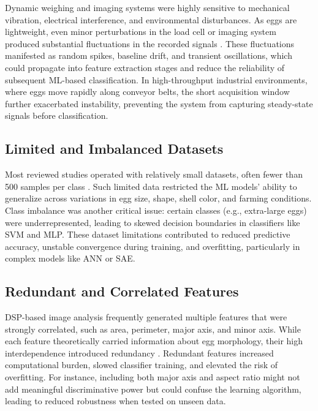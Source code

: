\documentclass[conference]{IEEEtran}
\begin{document}
	Dynamic weighing and imaging systems were highly sensitive to mechanical vibration, electrical interference, and environmental disturbances. As eggs are lightweight, even minor perturbations in the load cell or imaging system produced substantial fluctuations in the recorded signals \cite{yabanova2017}. These fluctuations manifested as random spikes, baseline drift, and transient oscillations, which could propagate into feature extraction stages and reduce the reliability of subsequent ML-based classification. In high-throughput industrial environments, where eggs move rapidly along conveyor belts, the short acquisition window further exacerbated instability, preventing the system from capturing steady-state signals before classification.
	
	\subsection{Limited and Imbalanced Datasets}
	
	Most reviewed studies operated with relatively small datasets, often fewer than 500 samples per class \cite{asadi2010}\cite{nasir2018}. Such limited data restricted the ML models’ ability to generalize across variations in egg size, shape, shell color, and farming conditions. Class imbalance was another critical issue: certain classes (e.g., extra-large eggs) were underrepresented, leading to skewed decision boundaries in classifiers like SVM and MLP. These dataset limitations contributed to reduced predictive accuracy, unstable convergence during training, and overfitting, particularly in complex models like ANN or SAE.
	
	\subsection{Redundant and Correlated Features}
	
	DSP-based image analysis frequently generated multiple features that were strongly correlated, such as area, perimeter, major axis, and minor axis. While each feature theoretically carried information about egg morphology, their high interdependence introduced redundancy \cite{soltani2015}. Redundant features increased computational burden, slowed classifier training, and elevated the risk of overfitting. For instance, including both major axis and aspect ratio might not add meaningful discriminative power but could confuse the learning algorithm, leading to reduced robustness when tested on unseen data.
	
\end{document}
